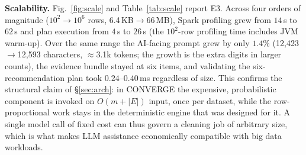 \noindent\textbf{Scalability.} Fig.~\ref{fig:scale} and Table~\ref{tab:scale} report E3. Across four orders of magnitude ($10^2\to10^6$ rows, 6.4\,KB$\to$66\,MB), Spark profiling grew from $14$\,s to $62$\,s and plan execution from $4$\,s to $26$\,s (the $10^2$-row profiling time includes JVM warm-up). Over the same range the AI-facing prompt grew by only $1.4\%$ (12{,}423$\to$12{,}593 characters, $\approx$3.1k tokens; the growth is the extra digits in larger counts), the evidence bundle stayed at six items, and validating the six-recommendation plan took $0.24$--$0.40$\,ms regardless of size. This confirms the structural claim of \S\ref{sec:arch}: in CONVERGE the expensive, probabilistic component is invoked on $O(m+|E|)$ input, once per dataset, while the row-proportional work stays in the deterministic engine that was designed for it. A single model call of fixed cost can thus govern a cleaning job of arbitrary size, which is what makes LLM assistance economically compatible with big data workloads.
